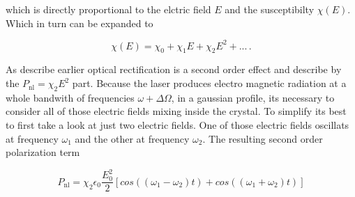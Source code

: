 which is directly proportional to the elctric field $E$ and the susceptibilty $\chi(E)$.
Which in turn can be expanded to 

\begin{equation}
    \chi(E) = \chi_0 + \chi_1 E +\chi_2 E^2 + ...   \, .
\end{equation}

As describe earlier optical rectification is a second order effect and describe by the $P_\text{nl} = \chi_2 E^2$ part.
Because the laser produces electro magnetic radiation at a whole bandwith of frequencies $\omega + \Delta\Omega$, in a gaussian profile, its necessary to consider all of those electric fields mixing inside the crystal.
To simplify its best to first take a look at just two electric fields.
One of those electric fields oscillats at frequency $\omega_1$ and the other at frequency $\omega_2$.
The resulting second order polarization term 

\begin{equation}
    P_\text{nl} = \chi_2 \epsilon_0 \frac{E_0^2}{2}\left[cos((\omega_1 - \omega_2)t) + cos((\omega_1 + \omega_2)t)\right]
\label{eq:two_freq_mixing}
\end{equation}

